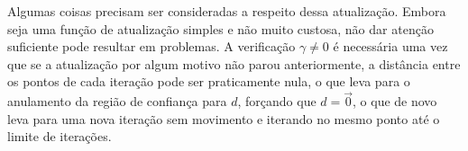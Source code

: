 Algumas coisas precisam ser consideradas a respeito dessa atualização. Embora seja
uma função de atualização simples e não muito custosa, não dar atenção suficiente
pode resultar em problemas. A verificação \(\gamma \ne 0\) é necessária uma vez que
se a atualização por algum motivo não parou anteriormente, a distância entre os
pontos de cada iteração pode ser praticamente nula, o que leva para o anulamento
da região de confiança para \(d\), forçando que \(d = \overrightarrow 0\), o que
de novo leva para uma nova iteração sem movimento e iterando no mesmo ponto até
o limite de iterações.
